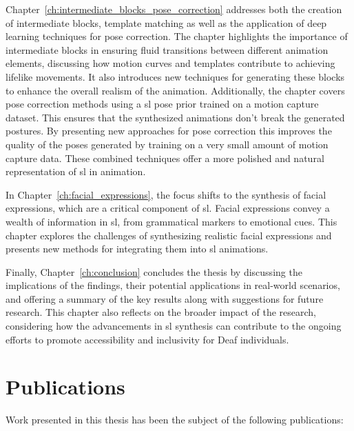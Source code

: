 \documentclass[../../main.tex]{subfiles}
\begin{document}
Chapter~\ref{ch:intermediate_blocks_pose_correction} addresses both the creation of intermediate blocks, template matching as well as the application of deep learning techniques for pose correction. The chapter highlights the importance of intermediate blocks in ensuring fluid transitions between different animation elements, discussing how motion curves and templates contribute to achieving lifelike movements. It also introduces new techniques for generating these blocks to enhance the overall realism of the animation. Additionally, the chapter covers pose correction methods using a \gls{sl} pose prior trained on a motion capture dataset. This ensures that the synthesized animations don't break the generated postures. By presenting new approaches for pose correction this improves the quality of the poses generated by training on a very small amount of motion capture data. These combined techniques offer a more polished and natural representation of \gls{sl} in animation.

In Chapter~\ref{ch:facial_expressions}, the focus shifts to the synthesis of facial expressions, which are a critical component of \gls{sl}. Facial expressions convey a wealth of information in \gls{sl}, from grammatical markers to emotional cues. This chapter explores the challenges of synthesizing realistic facial expressions and presents new methods for integrating them into \gls{sl} animations.

Finally, Chapter~\ref{ch:conclusion} concludes the thesis by discussing the implications of the findings, their potential applications in real-world scenarios, and offering a summary of the key results along with suggestions for future research. This chapter also reflects on the broader impact of the research, considering how the advancements in \gls{sl} synthesis can contribute to the ongoing efforts to promote accessibility and inclusivity for Deaf individuals.

\section{Publications}

Work presented in this thesis has been the subject of the following publications:
\end{document}
